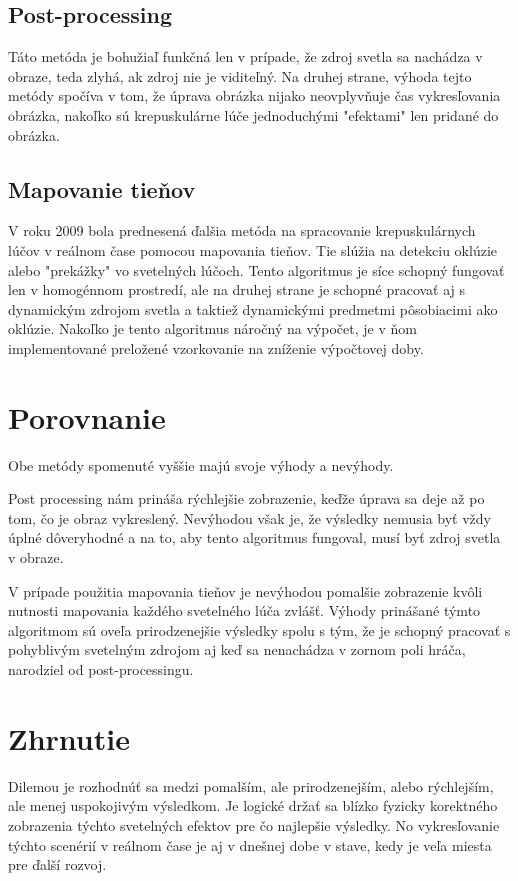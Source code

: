 \documentclass[10pt,twoside,slovak,a4paper]{article}
\begin{document}
\subsection{Post-processing} \label{spracovanie:pp}
Táto metóda je bohužiaľ funkčná len v prípade, že zdroj svetla sa nachádza v obraze, 
teda zlyhá, ak zdroj nie je viditeľný. Na druhej strane, výhoda tejto metódy spočíva v 
tom, že úprava obrázka nijako neovplyvňuje čas vykresľovania obrázka, nakoľko sú 
krepuskulárne lúče jednoduchými "efektami" len pridané do obrázka\cite{Light_shafts}.

\subsection{Mapovanie tieňov} \label{spracovanie:mt}
V roku 2009 bola prednesená ďalšia metóda na spracovanie krepuskulárnych lúčov v reálnom 
čase pomocou mapovania tieňov. Tie slúžia na detekciu oklúzie alebo "prekážky" vo svetelných 
lúčoch. Tento algoritmus je síce schopný fungovať len v homogénnom prostredí, ale na druhej 
strane je schopné pracovať aj s dynamickým zdrojom svetla a taktiež dynamickými predmetmi 
pôsobiacimi ako oklúzie. Nakoľko je tento algoritmus náročný na výpočet, je v ňom 
implementované preložené vzorkovanie na zníženie výpočtovej doby\cite{God_rays}.

\section{Porovnanie} 
\label{por}
Obe metódy spomenuté vyššie majú svoje výhody  a nevýhody.

Post processing nám prináša rýchlejšie zobrazenie, keďže úprava sa deje až po tom, čo 
je obraz vykreslený. Nevýhodou však je, že výsledky nemusia byť vždy úplné dôveryhodné 
a na to, aby tento algoritmus fungoval, musí byť zdroj svetla v obraze. 

V prípade použitia mapovania tieňov je nevýhodou pomalšie zobrazenie kvôli nutnosti 
mapovania každého svetelného lúča zvlášť. Výhody prinášané týmto algoritmom sú oveľa 
prirodzenejšie výsledky spolu s tým, že je schopný pracovať s pohyblivým svetelným 
zdrojom aj keď sa nenachádza v zornom poli hráča, narodziel od post-processingu.

\section{Zhrnutie} 
\label{zhr}
Dilemou je rozhodnúť sa medzi pomalším, ale prirodzenejším, alebo rýchlejším, ale 
menej uspokojivým výsledkom. Je logické držať sa blízko fyzicky korektného zobrazenia 
týchto svetelných efektov pre čo najlepšie výsledky. No vykresľovanie týchto scenérií 
v reálnom čase je aj v dnešnej dobe v stave, kedy je veľa miesta pre ďalší rozvoj.





\end{document}

